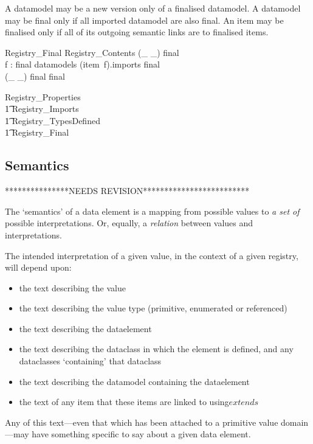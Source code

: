 \documentclass{llncs}
\def\refines{\mathrel{refines}}
\def\newVersionOf{\mathrel{newVersionOf}}
\def\extends{\mathrel{extends}}
\begin{document}
A datamodel may be a new version only of a finalised datamodel.  A datamodel may be final only if all imported datamodel are also final.  An item may be finalised only if all of its outgoing semantic links are to finalised items.

\begin{schema}{Registry\_Final}
 Registry\_Contents
  \where
  \ran (\_ \newVersionOf \_) \subseteq final \\
  \forall f : final \cap datamodels \spot (item~f).imports \subseteq final \\
  (\_ \refines \_) \limg final \rimg \subseteq final 
\end{schema}

\begin{zed}
  Registry\_Properties  \\ \t1
  Registry\_Imports \land {} \\ \t1 
  Registry\_TypesDefined \land {} \\ \t1
  Registry\_Final 
\end{zed}

\subsection{Semantics}

***************NEEDS REVISION*************************

The `semantics' of a data element is a mapping from possible values to \emph{a set of} possible interpretations.  Or, equally, a \emph{relation} between values and interpretations. 

The intended interpretation of a given value, in the context of a given registry, will depend upon:
\begin{itemize}
\item the text describing the value
\item the text describing the value type (primitive, enumerated or referenced)
\item the text describing the dataelement
\item the text describing the dataclass in which the element is defined,
  and any dataclasses `containing' that dataclass
\item the text describing the datamodel containing the dataelement
\item the text of any item that these items are linked to using$\extends$ 
\end{itemize}
Any of this text---even that which has been attached to a primitive value domain---may have something specific to say about a given data element.  
\end{document}
